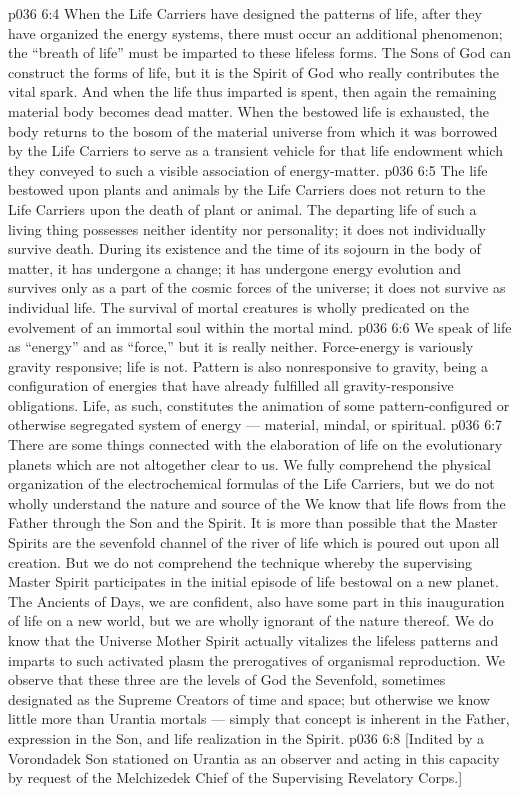 \vs p036 6:4 \pc When the Life Carriers have designed the patterns of life, after they have organized the energy systems, there must occur an additional phenomenon; the “breath of life” must be imparted to these lifeless forms. The Sons of God can construct the forms of life, but it is the Spirit of God who really contributes the vital spark. And when the life thus imparted is spent, then again the remaining material body becomes dead matter. When the bestowed life is exhausted, the body returns to the bosom of the material universe from which it was borrowed by the Life Carriers to serve as a transient vehicle for that life endowment which they conveyed to such a visible association of energy\hyp{}matter.
\vs p036 6:5 The life bestowed upon plants and animals by the Life Carriers does not return to the Life Carriers upon the death of plant or animal. The departing life of such a living thing possesses neither identity nor personality; it does not individually survive death. During its existence and the time of its sojourn in the body of matter, it has undergone a change; it has undergone energy evolution and survives only as a part of the cosmic forces of the universe; it does not survive as individual life. The survival of mortal creatures is wholly predicated on the evolvement of an immortal soul within the mortal mind.
\vs p036 6:6 \pc We speak of life as “energy” and as “force,” but it is really neither. Force\hyp{}energy is variously gravity responsive; life is not. Pattern is also nonresponsive to gravity, being a configuration of energies that have already fulfilled all gravity\hyp{}responsive obligations. Life, as such, constitutes the animation of some pattern\hyp{}configured or otherwise segregated system of energy --- material, mindal, or spiritual.
\vs p036 6:7 \pc There are some things connected with the elaboration of life on the evolutionary planets which are not altogether clear to us. We fully comprehend the physical organization of the electrochemical formulas of the Life Carriers, but we do not wholly understand the nature and source of the  We know that life flows from the Father through the Son and  the Spirit. It is more than possible that the Master Spirits are the sevenfold channel of the river of life which is poured out upon all creation. But we do not comprehend the technique whereby the supervising Master Spirit participates in the initial episode of life bestowal on a new planet. The Ancients of Days, we are confident, also have some part in this inauguration of life on a new world, but we are wholly ignorant of the nature thereof. We do know that the Universe Mother Spirit actually vitalizes the lifeless patterns and imparts to such activated plasm the prerogatives of organismal reproduction. We observe that these three are the levels of God the Sevenfold, sometimes designated as the Supreme Creators of time and space; but otherwise we know little more than Urantia mortals --- simply that concept is inherent in the Father, expression in the Son, and life realization in the Spirit.
\vsetoff
\vs p036 6:8 [Indited by a Vorondadek Son stationed on Urantia as an observer and acting in this capacity by request of the Melchizedek Chief of the Supervising Revelatory Corps.]
\quizlink
